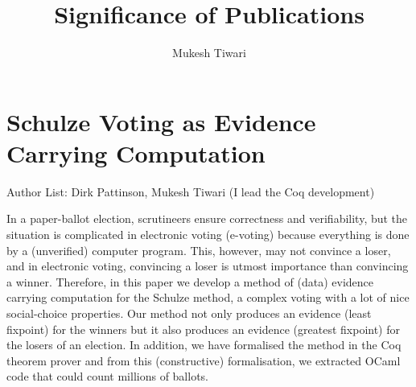 \documentclass[a4paper]{article}
\title{Significance of Publications}
\author{Mukesh Tiwari}
\date{}
\begin{document}
\fontsize{12}{15}
\selectfont
\maketitle



\section{Schulze Voting as Evidence Carrying Computation}
Author List: Dirk Pattinson, Mukesh Tiwari (I lead the Coq development)

In a paper-ballot election, scrutineers ensure correctness and verifiability,
but the situation is complicated in electronic voting (e-voting) because 
everything is done by a (unverified) computer program.  
This, however, may not convince a loser, and 
in electronic voting, convincing a loser is utmost importance than convincing a winner. 
Therefore, in this paper we develop a method of 
(data) evidence carrying computation for the Schulze method, a complex voting with 
a lot of nice social-choice properties. 
Our method not only produces an evidence (least fixpoint) for the winners but 
it also produces an evidence (greatest fixpoint) for the losers of an election. In addition, 
we have formalised the method in the Coq theorem prover and from this (constructive)
formalisation, we extracted OCaml code that could count millions of ballots.
\end{document}
